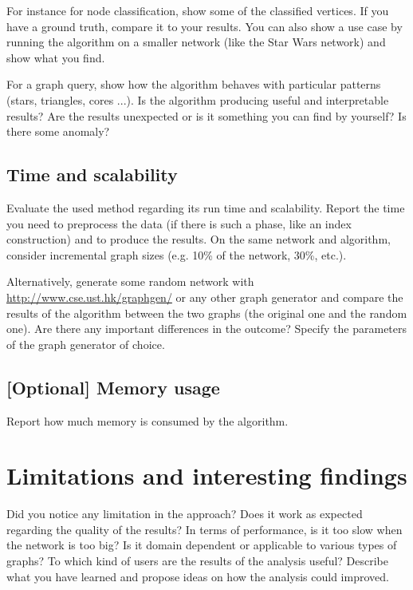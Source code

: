 \documentclass[11pt,a4paper,onecolumn,notitlepage]{article}
\begin{document}
For instance for node classification, show some of the classified vertices. If you have a ground truth, compare it to your results. You can also show a use case by running the algorithm on a smaller network (like the Star Wars network) and show what you find. 

For a graph query, show how the algorithm behaves with particular patterns (stars, triangles, cores ...).  Is the algorithm producing useful and interpretable results? Are the results unexpected or is it something you can find by yourself? Is there some anomaly?

\subsection{Time and scalability}

Evaluate the used method regarding its run time and scalability. Report the time you need to preprocess  the data (if there is such a phase, like an index construction) and to produce the results. On the same network and algorithm, consider incremental graph sizes (e.g. 10\% of the network, 30\%, etc.). 

\smallskip
\noindent Alternatively, generate some random network with \url{http://www.cse.ust.hk/graphgen/} or any other graph generator and compare the results of the algorithm between the two graphs (the original one and the random one). Are there any important differences in the outcome? Specify the parameters of the graph generator of choice. 


\subsection{[Optional] Memory usage}
Report how much memory is consumed by the algorithm. 


\section{Limitations and interesting findings}

Did you notice any limitation in the approach? Does it work as expected regarding the quality of the results? In terms of performance, is it too slow when the network is too big? Is it domain dependent or applicable to various types of graphs? To which kind of users are the results of the analysis useful? Describe what you have learned and propose ideas on how the analysis could improved. 




  
\end{document}
